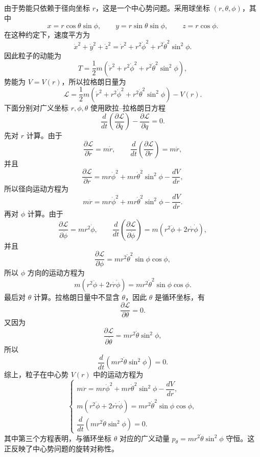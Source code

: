 \begin{solution}
\answer
由于势能只依赖于径向坐标 \(r\)，这是一个中心势问题。采用球坐标 \((r,\theta,\phi)\)，其中
\[
x=r\cos\theta\sin\phi,\qquad y=r\sin\theta\sin\phi,\qquad z=r\cos\phi .
\]
在这种约定下，速度平方为
\[
\dot{x}^{2}+\dot{y}^{2}+\dot{z}^{2}
=\dot{r}^{2}+r^{2}\dot{\phi}^{2}+r^{2}\dot{\theta}^{2}\sin^{2}\phi .
\]
因此粒子的动能为
\[
T=\frac{1}{2}m\left(\dot{r}^{2}+r^{2}\dot{\phi}^{2}+r^{2}\dot{\theta}^{2}\sin^{2}\phi\right),
\]
势能为 \(V=V(r)\)，所以拉格朗日量为
\[
\mathcal{L}
=\frac{1}{2}m\left(\dot{r}^{2}+r^{2}\dot{\phi}^{2}+r^{2}\dot{\theta}^{2}\sin^{2}\phi\right)-V(r).
\]
下面分别对广义坐标 \(r,\phi,\theta\) 使用欧拉--拉格朗日方程
\[
\frac{d}{dt}\left(\frac{\partial \mathcal{L}}{\partial \dot{q}}\right)-\frac{\partial \mathcal{L}}{\partial q}=0.
\]
先对 \(r\) 计算。由于
\[
\frac{\partial \mathcal{L}}{\partial \dot{r}}=m\dot{r},\qquad
\frac{d}{dt}\left(\frac{\partial \mathcal{L}}{\partial \dot{r}}\right)=m\ddot{r},
\]
并且
\[
\frac{\partial \mathcal{L}}{\partial r}
=mr\dot{\phi}^{2}+mr\dot{\theta}^{2}\sin^{2}\phi-\frac{dV}{dr},
\]
所以径向运动方程为
\[
m\ddot{r}=mr\dot{\phi}^{2}+mr\dot{\theta}^{2}\sin^{2}\phi-\frac{dV}{dr}.
\]
再对 \(\phi\) 计算。由于
\[
\frac{\partial \mathcal{L}}{\partial \dot{\phi}}=mr^{2}\dot{\phi},\qquad
\frac{d}{dt}\left(\frac{\partial \mathcal{L}}{\partial \dot{\phi}}\right)
=m\left(r^{2}\ddot{\phi}+2r\dot{r}\dot{\phi}\right),
\]
并且
\[
\frac{\partial \mathcal{L}}{\partial \phi}
=mr^{2}\dot{\theta}^{2}\sin\phi\cos\phi,
\]
所以 \(\phi\) 方向的运动方程为
\[
m\left(r^{2}\ddot{\phi}+2r\dot{r}\dot{\phi}\right)
=mr^{2}\dot{\theta}^{2}\sin\phi\cos\phi.
\]
最后对 \(\theta\) 计算。拉格朗日量中不显含 \(\theta\)，因此 \(\theta\) 是循环坐标，有
\[
\frac{\partial \mathcal{L}}{\partial \theta}=0.
\]
又因为
\[
\frac{\partial \mathcal{L}}{\partial \dot{\theta}}
=mr^{2}\dot{\theta}\sin^{2}\phi,
\]
所以
\[
\frac{d}{dt}\left(mr^{2}\dot{\theta}\sin^{2}\phi\right)=0.
\]
综上，粒子在中心势 \(V(r)\) 中的运动方程为
\[
\begin{cases}
m\ddot{r}=mr\dot{\phi}^{2}+mr\dot{\theta}^{2}\sin^{2}\phi-\dfrac{dV}{dr},\\[6pt]
m\left(r^{2}\ddot{\phi}+2r\dot{r}\dot{\phi}\right)=mr^{2}\dot{\theta}^{2}\sin\phi\cos\phi,\\[6pt]
\dfrac{d}{dt}\left(mr^{2}\dot{\theta}\sin^{2}\phi\right)=0.
\end{cases}
\]
其中第三个方程表明，与循环坐标 \(\theta\) 对应的广义动量
\(
p_{\theta}=mr^{2}\dot{\theta}\sin^{2}\phi
\)
守恒。这正反映了中心势问题的旋转对称性。
\end{solution}